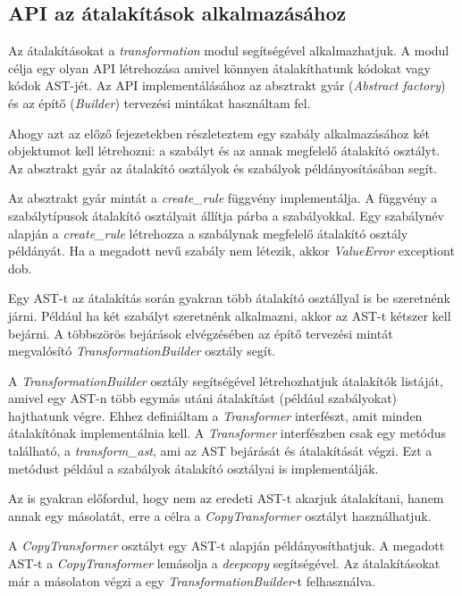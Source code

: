 \subsection{API az átalakítások alkalmazásához}

Az átalakításokat a \emph{transformation} modul segítségével alkalmazhatjuk.
A modul célja egy olyan API létrehozása amivel könnyen átalakíthatunk kódokat vagy kódok AST-jét.
Az API implementálásához az absztrakt gyár (\emph{Abstract factory}) és az építő (\emph{Builder})
tervezési mintákat használtam fel.

Ahogy azt az előző fejezetekben részleteztem
egy szabály alkalmazásához két objektumot kell létrehozni:
a szabályt és az annak megfelelő átalakító osztályt.
Az absztrakt gyár az átalakító osztályok és szabályok példányosításában segít.

Az absztrakt gyár mintát a \emph{create\_rule} függvény implementálja.
A függvény a szabálytípusok átalakító osztályait állítja párba a szabályokkal.
Egy szabálynév alapján a \emph{create\_rule} létrehozza
a szabálynak megfelelő átalakító osztály példányát.
Ha a megadott nevű szabály nem létezik, akkor \emph{ValueError} exceptiont dob.

Egy AST-t az átalakítás során gyakran több átalakító osztállyal is be szeretnénk járni.
Például ha két szabályt szeretnénk alkalmazni, akkor az AST-t kétszer kell bejárni.
A többszörös bejárások elvégzésében az építő tervezési mintát megvalósító
\emph{TransformationBuilder} osztály segít.

A \emph{TransformationBuilder} osztály segítségével
létrehozhatjuk átalakítók listáját, amivel egy AST-n több egymás utáni átalakítást
(például szabályokat) hajthatunk végre.
Ehhez definiáltam a \emph{Transformer} interfészt, amit minden átalakítónak
implementálnia kell.
A \emph{Transformer} interfészben csak egy metódus található, a \emph{transform\_ast},
ami az AST bejárását és átalakítását végzi.
Ezt a metódust például a szabályok átalakító osztályai is implementálják.

Az is gyakran előfordul, hogy nem az eredeti AST-t akarjuk átalakítani, hanem annak egy másolatát,
erre a célra a \emph{CopyTransformer} osztályt használhatjuk.

A \emph{CopyTransformer} osztályt egy AST-t alapján példányosíthatjuk.
A megadott AST-t a \emph{CopyTransformer} lemásolja a \emph{deepcopy} segítségével.
Az átalakításokat már a másolaton végzi a egy \emph{TransformationBuilder}-t felhasználva.

\pagebreak

